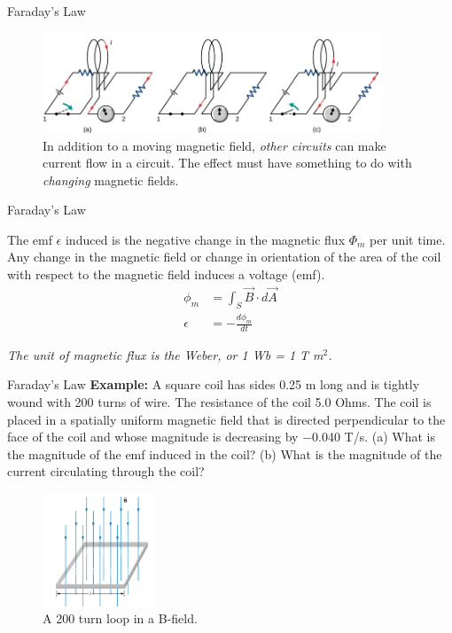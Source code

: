 \documentclass{beamer}
\begin{document}
\begin{frame}{Faraday's Law}
\begin{figure}
\centering
\includegraphics[width=0.9\textwidth]{figures/farad2.png}
\caption{\label{fig:farad2} In addition to a moving magnetic field, \textit{other circuits} can make current flow in a circuit.  The effect must have something to do with \textit{changing} magnetic fields.}
\end{figure}
\end{frame}

\begin{frame}{Faraday's Law}
\begin{tcolorbox}[colback=white,colframe=black!40!black,title=Faraday's Law]
\alert{The emf $\epsilon$ induced is the negative change in the magnetic flux $\Phi_m$ per unit time. Any change in the magnetic field
or change in orientation of the area of the coil with respect to the magnetic field induces a voltage (emf).
\begin{align}
\phi_m &= \int_S \vec{B} \cdot d\vec{A} \\
\epsilon &= - \frac{d\phi_m}{dt}
\label{eq:farad}
\end{align}}
\end{tcolorbox}
\textit{The unit of magnetic flux is the Weber, or 1 Wb = 1 T m$^2$.}
\end{frame}

\begin{frame}{Faraday's Law}
\small
\textbf{Example:}
A square coil has sides 0.25 m long and is tightly wound with 200 turns of wire. The resistance of the coil 5.0 Ohms. The coil is placed in a spatially uniform magnetic field that is directed perpendicular to the face of the coil and whose magnitude is decreasing by −0.040 T/s. (a) What is the magnitude of the emf induced in the coil? (b) What is the magnitude of the current circulating through the coil?
\begin{figure}
\centering
\includegraphics[width=0.3\textwidth]{figures/loop1.png}
\caption{\label{fig:loop1} A 200 turn loop in a B-field.}
\end{figure}
\end{frame}
\end{document}
